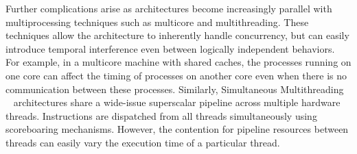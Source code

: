 Further complications arise as architectures become increasingly parallel with multiprocessing techniques such as multicore and multithreading.
These techniques allow the architecture to inherently handle concurrency, but can easily introduce temporal interference even between logically independent behaviors.
For example, in a multicore machine with shared caches, the processes running on one core can affect the timing of processes on another core even when there is no communication between these processes.
Similarly, Simultaneous Multithreading ~\cite{Tullsen1995SMT} architectures share a wide-issue superscalar pipeline across multiple hardware threads.
Instructions are dispatched from all threads simultaneously using scoreboaring mechanisms.
However, the contention for pipeline resources between threads can easily vary the execution time of a particular thread. 

